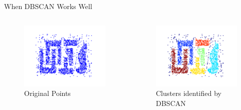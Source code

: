 \begin{frame}[allowframebreaks]{When DBSCAN Works Well}
\begin{columns}
    \begin{column}{0.5\textwidth}
       \begin{figure}
            \centering
            \includegraphics[width=1\textwidth,keepaspectratio]{images/dul/dbscan/dbscan-original-pts-1.png}
            \caption{Original Points}
        \end{figure}
    \end{column}
    \begin{column}{0.5\textwidth}
        \begin{figure}
            \centering
            \includegraphics[width=1\textwidth,keepaspectratio]{images/dul/dbscan/dbscan-clusters.png}
            \caption{Clusters identified by DBSCAN}
        \end{figure}
    \end{column}
\end{columns}


\end{frame}
